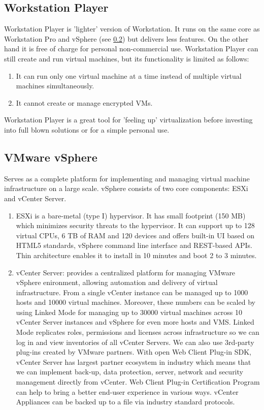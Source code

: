 \subsection{Workstation Player}
Workstation Player is 'lighter' version of Workstation. It runs on the same core as Workstation Pro and vSphere (see \ref{vmware_sphere}) but delivers less features. On the other hand it is free of charge for personal non-commercial use. Workstation Player can still create and run virtual machines, but its functionality is limited as follows:
\begin{enumerate}
\item It can run only one virtual machine at a time instead of multiple virtual machines simultaneously.
\item It cannot create or manage encrypted VMs.
\end{enumerate}
Workstation Player is a great tool for 'feeling up' virtualization before investing into full blown solutions or for a simple personal use.

\subsection{VMware vSphere}
\label{vmware_sphere}
Serves as a complete platform for implementing and managing virtual machine infrastructure on a large scale. vSphere consists of two core components: ESXi and vCenter Server.
\begin{enumerate}
\item ESXi is a bare-metal (type I) hypervisor. It has small footprint (150 MB) which minimizes security threats to the hypervisor. It can support up to 128 virtual CPUs, 6 TB of RAM and 120 devices and offers built-in UI based on HTML5 standards, vSphere command line interface and REST-based APIs. Thin architecture enables it to install in 10 minutes and boot 2 to 3 minutes.
\item vCenter Server: provides a centralized platform for managing VMware vSphere enironment, allowing automation and delivery of virtual infrastructure. From a single vCenter instance can be managed up to 1000 hosts and 10000 virtual machines. Moreover, these numbers can be scaled by using Linked Mode for managing up to 30000 virtual machines across 10 vCenter Server instances and vSphere for even more hosts and VMS. Linked Mode replicates roles, permissions and licenses across infrastructure so we can log in and view inventories of all vCenter Servers. We can also use 3rd-party plug-ins created by VMware partners. With open Web Client Plug-in SDK, vCenter Server has largest partner ecosystem in industry which means that we can implement back-up, data protection, server, network and security management directly from vCenter. Web Client Plug-in Certification Program can help to bring a better end-user experience in various ways. vCenter Appliances can be backed up to a file via industry standard protocols.
\end{enumerate}

